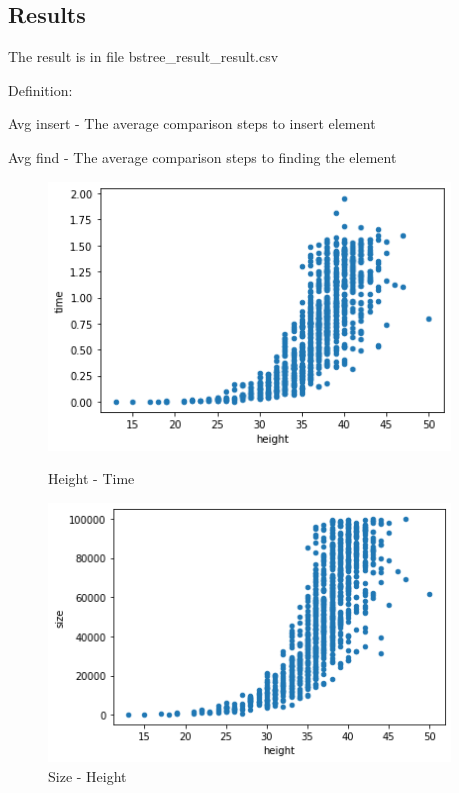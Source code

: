 \documentclass[a4]{article}
\begin{document}
\subsection{Results}

The result is in file bstree\_result\_result.csv

Definition:

Avg insert - The average comparison steps to insert element

Avg find - The average comparison steps to finding the element

\begin{figure}[H]
    \begin{minipage}{0.48\textwidth}
    \includegraphics[width=0.95\textwidth]{b-height-time.png}
    \caption{Height - Time}
    \end{minipage}
    \begin{minipage}{0.48\textwidth}
    \includegraphics[width=0.95\textwidth]{b-height-size.png}
    \caption{Size - Height}
    \end{minipage}

\end{figure}
\end{document}
